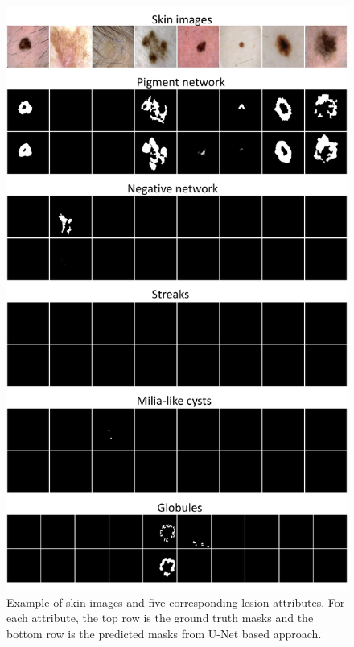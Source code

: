 \documentclass{article}
\begin{document}
\begin{figure}
\centering
\label{fig2}
\includegraphics[scale=0.65,trim=0 0 0 0]{skin.png}
\caption{Example of skin images and five corresponding lesion attributes. For each attribute, the top row is the ground truth masks and the bottom row is the predicted masks from U-Net based approach.}
\end{figure}
\end{document}
